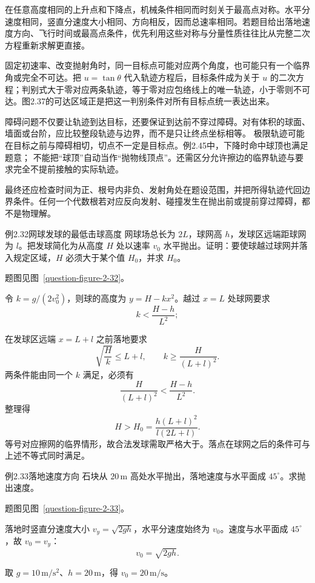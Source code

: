 在任意高度相同的上升点和下降点，机械条件相同而时刻关于最高点对称。水平分速度相同，竖直分速度大小相同、方向相反，因而总速率相同。若题目给出落地速度方向、飞行时间或最高点条件，优先利用这些对称与分量性质往往比从完整二次方程重新求解更直接。

固定初速率、改变抛射角时，同一目标点可能对应两个角度，也可能只有一个临界角或完全不可达。把 $u=\tan\theta$ 代入轨迹方程后，目标条件成为关于 $u$ 的二次方程；判别式大于零对应两条轨迹，等于零对应包络线上的唯一轨迹，小于零则不可达。图2.37的可达区域正是把这一判别条件对所有目标点统一表达出来。

障碍问题不仅要让轨迹到达目标，还要保证到达前不穿过障碍。对有体积的球面、墙面或台阶，应比较整段轨迹与边界，而不是只让终点坐标相等。
极限轨迹可能在目标之前与障碍相切，切点不一定是目标点。例2.45中，下降时命中球顶也满足题意；
不能把“球顶”自动当作“抛物线顶点”。还需区分允许擦边的临界轨迹与要求完全不提前接触的实际轨迹。

最终还应检查时间为正、根号内非负、发射角处在题设范围，并把所得轨迹代回边界条件。任何一个代数根若对应反向发射、碰撞发生在抛出前或提前穿过障碍，都不是物理解。

\begin{origexamplebox}{例2.32\quad 网球发球的最低击球高度}
网球场总长为 $2L$，球网高 $h$，发球区远端距球网为 $l$。把发球简化为从高度 $H$ 处以速率 $v_0$ 水平抛出。证明：要使球越过球网并落入规定区域，$H$ 必须大于某个值 $H_0$，并求 $H_0$。
\par 题图见图~\ref{question-figure-2-32}。
\KQuestionBG
\end{origexamplebox}
\begin{xesolution}
令 $k=g/(2v_0^2)$，则球的高度为 $y=H-kx^2$。越过 $x=L$ 处球网要求
\[
 k<\frac{H-h}{L^2};
\]
\TennisServeDiagram

在发球区远端 $x=L+l$ 之前落地要求
\[
 \sqrt{\frac Hk}\le L+l,\qquad k\ge\frac{H}{(L+l)^2}.
\]
两条件能由同一个 $k$ 满足，必须有
\[
 \frac{H}{(L+l)^2}<\frac{H-h}{L^2}.
\]
整理得
\[
 \boxed{H>H_0=\frac{h(L+l)^2}{l(2L+l)}}.
\]
等号对应擦网的临界情形，故合法发球需取严格大于。落点在球网之后的条件可与上述不等式同时满足。
\end{xesolution}

\ifdefined\Needspace{}\fi
\begin{origexamplebox}{例2.33\quad 落地速度方向}
石块从 $20\,\mathrm m$ 高处水平抛出，落地速度与水平面成 $45^\circ$。求抛出速度。
\par 题图见图~\ref{question-figure-2-33}。
\KQuestionBH
\end{origexamplebox}
\begin{xesolution}
落地时竖直分速度大小 $v_y=\sqrt{2gh}$，水平分速度始终为 $v_0$。速度与水平面成 $45^\circ$，故 $v_0=v_y$：
\[
 \boxed{v_0=\sqrt{2gh}}.
\]
\HorizontalThrowImpactDiagram

取 $g=10\,\mathrm{m/s^2}$、$h=20\,\mathrm m$，得 $\boxed{v_0=20\,\mathrm{m/s}}$。
\end{xesolution}

